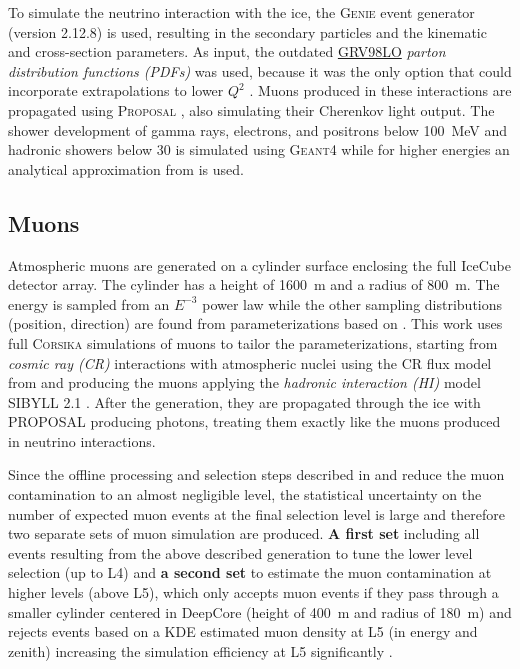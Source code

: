 To simulate the neutrino interaction with the ice, the \textsc{Genie} event generator  (version 2.12.8) is used, resulting in the secondary particles and the kinematic and cross-section parameters. As input, the outdated \href{https://internal.dunescience.org/doxygen/classgenie_1_1GRV89LO.html}{GRV98LO}  \textit{parton distribution functions (PDFs)} was used, because it was the only option that could incorporate extrapolations to lower $Q^2$ . Muons produced in these interactions are propagated using \textsc{Proposal} , also simulating their Cherenkov light output. The shower development of gamma rays, electrons, and positrons below \SI{100}{\mega\electronvolt} and hadronic showers below \SI{30}{\gev} is simulated using \textsc{Geant4}  while for higher energies an analytical approximation from  is used.


\subsection{Muons}

Atmospheric muons are generated on a cylinder surface enclosing the full IceCube detector array. The cylinder has a height of \SI{1600}{\meter} and a radius of \SI{800}{\meter}. The energy is sampled from an $E^{-3}$ power law while the other sampling distributions (position, direction) are found from parameterizations based on . This work uses full \textsc{Corsika}  simulations of muons to tailor the parameterizations, starting from \textit{cosmic ray (CR)} interactions with atmospheric nuclei using the CR  flux model from  and producing the muons applying the \textit{hadronic interaction (HI)} model SIBYLL 2.1 . After the generation, they are propagated through the ice with PROPOSAL producing photons, treating them exactly like the muons produced in neutrino interactions.

Since the offline processing and selection steps described in  and  reduce the muon contamination to an almost negligible level, the statistical uncertainty on the number of expected muon events at the final selection level is large and therefore two separate sets of muon simulation are produced. \textbf{A first set} including all events resulting from the above described generation to tune the lower level selection (up to L4) and \textbf{a second set} to estimate the muon contamination at higher levels (above L5), which only accepts muon events if they pass through a smaller cylinder centered in DeepCore (height of \SI{400}{\meter} and radius of \SI{180}{\meter}) and rejects events based on a KDE estimated muon density at L5 (in energy and zenith) increasing the simulation efficiency at L5 significantly .



